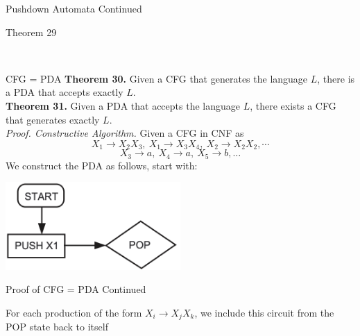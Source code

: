 \documentclass{article}
\begin{document}
\begin{multicols*}{3}
\begin{blackbox}{Pushdown Automata Continued}
\begin{brownbox}{Theorem 29}
\begin{center}
        \end{center}
    \end{brownbox}\\[-2ex]
\end{blackbox}
\begin{blackbox}{CFG = PDA}
    \textbf{Theorem 30.} Given a CFG that generates the language $L$, there is a PDA that accepts exactly $L$.\\[1ex]
    \textbf{Theorem 31.} Given a PDA that accepts the language $L$, there exists a CFG that generates exactly $L$.\\[1ex]
    \textit{Proof. Constructive Algorithm.} Given a CFG in CNF as\\[-0.5ex]
    \[X_1 \rightarrow X_2X_3,\ X_1 \rightarrow X_3X_4,\ X_2 \rightarrow X_2X_2, \cdots\]
    \[X_3 \rightarrow a,\ X_4 \rightarrow a,\ X_5 \rightarrow b, \ldots\]
    We construct the PDA as follows, start with:
    \begin{center}
        \includegraphics[width=0.5\textwidth]{th30_1.png}
    \end{center}
\end{blackbox}
\begin{blackbox}{Proof of CFG = PDA Continued}
    \begin{multicols*}{2}
        \begin{minipage}{0.45\textwidth}
        For each production of the form $X_i \rightarrow X_jX_k$, we include this circuit from the POP state back to itself

\end{minipage}
\end{multicols*}
\end{blackbox}
\end{multicols*}
\end{document}
